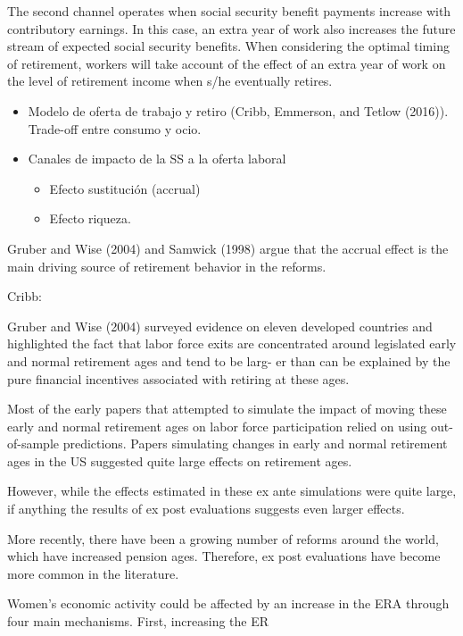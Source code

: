 \documentclass[]{article}
\providecommand{\tightlist}{%
  \setlength{\itemsep}{0pt}\setlength{\parskip}{0pt}}
\begin{document}
The second channel operates when social security benefit payments
increase with contributory earnings. In this case, an extra year of work
also increases the future stream of expected social security benefits.
When considering the optimal timing of retirement, workers will take
account of the effect of an extra year of work on the level of
retirement income when s/he eventually retires.

\begin{itemize}
\tightlist
\item
  Modelo de oferta de trabajo y retiro (Cribb, Emmerson, and Tetlow
  (2016)). Trade-off entre consumo y ocio.
\item
  Canales de impacto de la SS a la oferta laboral

  \begin{itemize}
  \tightlist
  \item
    Efecto sustitución (accrual)
  \item
    Efecto riqueza.
  \end{itemize}
\end{itemize}

Gruber and Wise (2004) and Samwick (1998) argue that the accrual effect
is the main driving source of retirement behavior in the reforms.

Cribb:

Gruber and Wise (2004) surveyed evidence on eleven developed countries
and highlighted the fact that labor force exits are concentrated around
legislated early and normal retirement ages and tend to be larg- er than
can be explained by the pure financial incentives associated with
retiring at these ages.

Most of the early papers that attempted to simulate the impact of moving
these early and normal retirement ages on labor force participation
relied on using out-of-sample predictions. Papers simulating changes in
early and normal retirement ages in the US suggested quite large effects
on retirement ages.

However, while the effects estimated in these ex ante simulations were
quite large, if anything the results of ex post evaluations suggests
even larger effects.

More recently, there have been a growing number of reforms around the
world, which have increased pension ages. Therefore, ex post evaluations
have become more common in the literature.

Women's economic activity could be affected by an increase in the ERA
through four main mechanisms. First, increasing the ER
\end{document}
